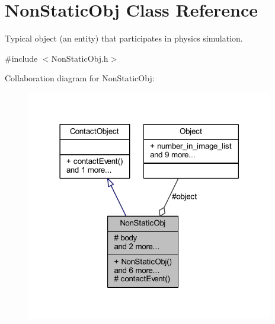 \hypertarget{class_non_static_obj}{}\section{Non\+Static\+Obj Class Reference}
\label{class_non_static_obj}


Typical object (an entity) that participates in physics simulation.  




{\ttfamily \#include $<$Non\+Static\+Obj.\+h$>$}



Collaboration diagram for Non\+Static\+Obj\+:
\nopagebreak
\begin{figure}[H]
\begin{center}
\leavevmode
\includegraphics[width=306pt]{class_non_static_obj__coll__graph}
\end{center}
\end{figure}
